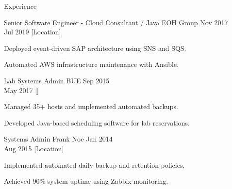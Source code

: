 \begin{rSection}{Experience}
    \begin{rSubsection}
        {Senior Software Engineer - Cloud Consultant / Java}
        {EOH Group}
        {Nov 2017 \\ Jul 2019}
        [Location] %
        \begin{rItemize}
            \item Deployed event-driven SAP architecture using SNS and SQS.
            \item Automated AWS infrastructure maintenance with Ansible.
        \end{rItemize}
    \end{rSubsection}

    \begin{rSubsection}
        {Lab Systems Admin}
        {BUE}
        {Sep 2015 \\ May 2017}
        []
        \begin{rItemize}
            \item Managed 35+ hosts and implemented automated backups.
            \item Developed Java-based scheduling software for lab reservations.
        \end{rItemize}
    \end{rSubsection}

    \begin{rSubsection}
        {Systems Admin}
        {Frank Noe}
        {Jan 2014 \\ Aug 2015}
        [Location] %
        \begin{rItemize}
            \item Implemented automated daily backup and retention policies.
            \item Achieved 90\% system uptime using Zabbix monitoring.
        \end{rItemize}
    \end{rSubsection}
\end{rSection}